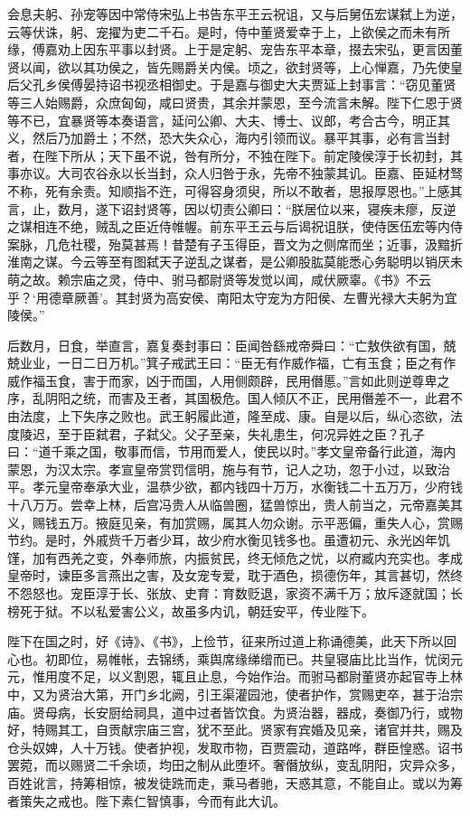 \documentclass[12pt,UTF8]{ctexbook}
\begin{document}
会息夫躬、孙宠等因中常侍宋弘上书告东平王云祝诅，又与后舅伍宏谋弑上为逆，云等伏诛，躬、宠擢为吏二千石。是时，侍中董贤爱幸于上，上欲侯之而未有所缘，傅嘉劝上因东平事以封贤。上于是定躬、宠告东平本章，掇去宋弘，更言因董贤以闻，欲以其功侯之，皆先赐爵关内侯。顷之，欲封贤等，上心惮嘉，乃先使皇后父孔乡侯傅晏持诏书视丞相御史。于是嘉与御史大夫贾延上封事言：“窃见董贤等三人始赐爵，众庶匈匈，咸曰贤贵，其余并蒙恩，至今流言未解。陛下仁恩于贤等不已，宜暴贤等本奏语言，延问公卿、大夫、博士、议郎，考合古今，明正其义，然后乃加爵土；不然，恐大失众心，海内引领而议。暴平其事，必有言当封者，在陛下所从；天下虽不说，咎有所分，不独在陛下。前定陵侯淳于长初封，其事亦议。大司农谷永以长当封，众人归咎于永，先帝不独蒙其讥。臣嘉、臣延材驽不称，死有余责。知顺指不迕，可得容身须臾，所以不敢者，思报厚恩也。”上感其言，止，数月，遂下诏封贤等，因以切责公卿曰：“朕居位以来，寝疾未瘳，反逆之谋相连不绝，贼乱之臣近侍帷幄。前东平王云与后谒祝诅朕，使侍医伍宏等内侍案脉，几危社稷，殆莫甚焉！昔楚有子玉得臣，晋文为之侧席而坐；近事，汲黯折淮南之谋。今云等至有图弑天子逆乱之谋者，是公卿股肱莫能悉心务聪明以销厌未萌之故。赖宗庙之灵，侍中、驸马都尉贤等发觉以闻，咸伏厥辜。《书》不云乎？‘用德章厥善’。其封贤为高安侯、南阳太守宠为方阳侯、左曹光禄大夫躬为宜陵侯。”



后数月，日食，举直言，嘉复奏封事曰：臣闻咎繇戒帝舜曰：“亡敖佚欲有国，兢兢业业，一日二日万机。”箕子戒武王曰：“臣无有作威作福，亡有玉食；臣之有作威作福玉食，害于而家，凶于而国，人用侧颇辟，民用僭慝。”言如此则逆尊卑之序，乱阴阳之统，而害及王者，其国极危。国人倾仄不正，民用僭差不一，此君不由法度，上下失序之败也。武王躬履此道，隆至成、康。自是以后，纵心恣欲，法度陵迟，至于臣弑君，子弑父。父子至亲，失礼患生，何况异姓之臣？孔子曰：“道千乘之国，敬事而信，节用而爱人，使民以时。”孝文皇帝备行此道，海内蒙恩，为汉太宗。孝宣皇帝赏罚信明，施与有节，记人之功，忽于小过，以致治平。孝元皇帝奉承大业，温恭少欲，都内钱四十万万，水衡钱二十五万万，少府钱十八万万。尝幸上林，后宫冯贵人从临兽圈，猛兽惊出，贵人前当之，元帝嘉美其义，赐钱五万。掖庭见亲，有加赏赐，属其人勿众谢。示平恶偏，重失人心，赏赐节约。是时，外戚赀千万者少耳，故少府水衡见钱多也。虽遭初元、永光凶年饥馑，加有西羌之变，外奉师旅，内振贫民，终无倾危之忧，以府臧内充实也。孝成皇帝时，谏臣多言燕出之害，及女宠专爱，耽于酒色，损德伤年，其言甚切，然终不怨怒也。宠臣淳于长、张放、史育：育数贬退，家资不满千万；放斥逐就国；长榜死于狱。不以私爱害公义，故虽多内讥，朝廷安平，传业陛下。



陛下在国之时，好《诗》、《书》，上俭节，征来所过道上称诵德美，此天下所以回心也。初即位，易帷帐，去锦绣，乘舆席缘绨缯而已。共皇寝庙比比当作，忧闵元元，惟用度不足，以义割恩，辄且止息，今始作治。而驸马都尉董贤亦起官寺上林中，又为贤治大第，开门乡北阙，引王渠灌园池，使者护作，赏赐吏卒，甚于治宗庙。贤母病，长安厨给祠具，道中过者皆饮食。为贤治器，器成，奏御乃行，或物好，特赐其工，自贡献宗庙三宫，犹不至此。贤家有宾婚及见亲，诸官并共，赐及仓头奴婢，人十万钱。使者护视，发取市物，百贾震动，道路哗，群臣惶惑。诏书罢菀，而以赐贤二千余顷，均田之制从此堕坏。奢僭放纵，变乱阴阳，灾异众多，百姓讹言，持筹相惊，被发徒跣而走，乘马者驰，天惑其意，不能自止。或以为筹者策失之戒也。陛下素仁智慎事，今而有此大讥。
\end{document}
